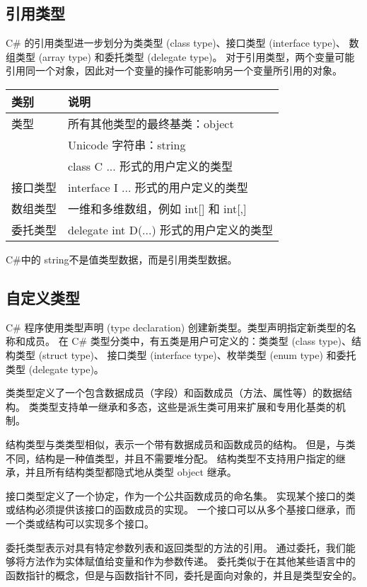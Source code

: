 \subsection{引用类型}
C\# 的引用类型进一步划分为类类型 (class type)、接口类型 (interface type)、
数组类型 (array type) 和委托类型 (delegate type)。
对于引用类型，两个变量可能引用同一个对象，因此对一个变量的操作可能影响另一个变量所引用的对象。

\begin{tabular}{|l|l|}
\hline
类别   & 说明 \\
\hline
类型  &  所有其他类型的最终基类：object \\
              &  Unicode 字符串：string \\
              &  class C {...} 形式的用户定义的类型 \\
\hline
接口类型  & interface I {...} 形式的用户定义的类型  \\
数组类型  & 一维和多维数组，例如 int[] 和 int[,]  \\
委托类型  & delegate int D(...) 形式的用户定义的类型  \\
\hline
\end{tabular}

C\#中的 string不是值类型数据，而是引用类型数据。

\subsection{自定义类型}
C\# 程序使用类型声明 (type declaration) 创建新类型。类型声明指定新类型的名称和成员。
在 C\# 类型分类中，有五类是用户可定义的：类类型 (class type)、结构类型 (struct type)、
接口类型 (interface type)、枚举类型 (enum type) 和委托类型 (delegate type)。


类类型定义了一个包含数据成员（字段）和函数成员（方法、属性等）的数据结构。
类类型支持单一继承和多态，这些是派生类可用来扩展和专用化基类的机制。

结构类型与类类型相似，表示一个带有数据成员和函数成员的结构。
但是，与类不同，结构是一种值类型，并且不需要堆分配。
结构类型不支持用户指定的继承，并且所有结构类型都隐式地从类型 object 继承。

接口类型定义了一个协定，作为一个公共函数成员的命名集。
实现某个接口的类或结构必须提供该接口的函数成员的实现。
一个接口可以从多个基接口继承，而一个类或结构可以实现多个接口。

委托类型表示对具有特定参数列表和返回类型的方法的引用。
通过委托，我们能够将方法作为实体赋值给变量和作为参数传递。
委托类似于在其他某些语言中的函数指针的概念，但是与函数指针不同，委托是面向对象的，并且是类型安全的。

